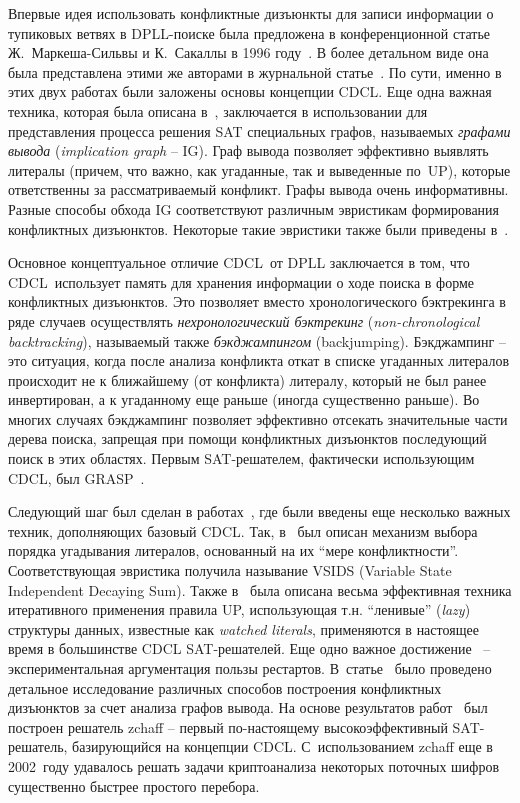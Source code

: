 Впервые идея использовать конфликтные дизъюнкты для записи информации о тупиковых ветвях в DPLL-поиске была предложена в конференционной статье Ж.~Маркеша-Сильвы и К.~Сакаллы в 1996 году~\cite{grasp}.
В более детальном виде она была представлена этими же авторами в журнальной статье~\cite{marques-silva1999}.
По сути, именно в этих двух работах были заложены основы концепции CDCL.
Еще одна важная техника, которая была описана в~\cite{grasp,marques-silva1999}, заключается в использовании для представления процесса решения SAT специальных графов, называемых \textit{графами вывода} (\textit{implication graph} \--- IG).
Граф вывода позволяет эффективно выявлять литералы (причем, что важно, как угаданные, так и выведенные по~UP), которые ответственны за рассматриваемый конфликт.
Графы вывода очень информативны.
Разные способы обхода IG соответствуют различным эвристикам формирования конфликтных дизъюнктов. Некоторые такие эвристики также были приведены в~\cite{grasp,marques-silva1999}.

Основное концептуальное отличие CDCL~от DPLL заключается в том, что CDCL~использует память для хранения информации о ходе поиска в форме конфликтных дизъюнктов.
Это позволяет вместо хронологического бэктрекинга в ряде случаев осуществлять \textit{нехронологический бэктрекинг} (\textit{non-chronological backtracking}), называемый также \textit{бэкджампингом} (backjumping).
Бэкджампинг \--- это ситуация, когда после анализа конфликта откат в списке угаданных литералов происходит не к ближайшему (от конфликта) литералу, который не был ранее инвертирован, а к угаданному еще раньше (иногда существенно раньше).
Во многих случаях бэкджампинг позволяет эффективно отсекать значительные части дерева поиска, запрещая при помощи конфликтных дизъюнктов последующий поиск в этих областях.
Первым SAT-решателем, фактически использующим CDCL, был GRASP~\cite{grasp}.

Следующий шаг был сделан в работах~\cite{moskewicz2001,zhang2001}, где были введены еще несколько важных техник, дополняющих базовый CDCL.
Так, в~\cite{moskewicz2001} был описан механизм выбора порядка угадывания литералов, основанный на их \enquote{мере конфликтности}.
Соответствующая эвристика получила называние VSIDS (Variable State Independent Decaying Sum).
Также в~\cite{moskewicz2001} была описана весьма эффективная техника итеративного применения правила UP, использующая т.н. \enquote{ленивые} (\textit{lazy}) структуры данных, известные как \textit{watched literals}, применяются в настоящее время в большинстве CDCL SAT-решателей.
Еще одно важное достижение~\cite{moskewicz2001} \--- экспериментальная аргументация пользы рестартов.
В~статье~\cite{zhang2001} было проведено детальное исследование различных способов построения конфликтных дизъюнктов за счет анализа графов вывода.
На основе результатов работ~\cite{moskewicz2001,zhang2001} был построен решатель zchaff \--- первый по-настоящему высокоэффективный SAT-решатель, базирующийся на концепции CDCL.
С~использованием zchaff еще в 2002~году удавалось решать задачи криптоанализа некоторых поточных шифров существенно быстрее простого перебора.

